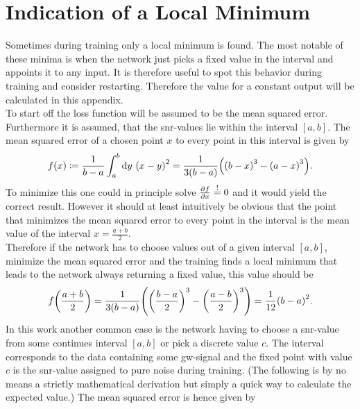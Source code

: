\section{Indication of a Local Minimum}\label{app:network_does_not_learn}
Sometimes during training only a local minimum is found. The most notable of these minima is when the network just picks a fixed value in the interval and appoints it to any input. It is therefore useful to spot this behavior during training and consider restarting. Therefore the value for a constant output will be calculated in this appendix.
\medskip\\
To start off the loss function will be assumed to be the mean squared error. Furthermore it is assumed, that the \gls{snr}-values lie within the interval $\left[a,b\right]$. The mean squared error of a chosen point $x$ to every point in this interval is given by
\begin{equation}
f(x)\coloneqq\frac{1}{b-a}\int_a^b\diff y\ \lr{x-y}^2=\frac{1}{3\lr{b-a}}\lr{\lr{b-x}^3-\lr{a-x}^3}.
\end{equation}
To minimize this one could in principle solve $\frac{\partial f}{\partial x}\overset{!}{=} 0$ and it would yield the correct result. However it should at least intuitively be obvious that the point that minimizes the mean squared error to every point in the interval is the mean value of the interval $x=\frac{a+b}{2}$.\\
Therefore if the network has to choose values out of a given interval $\left[a,b\right]$, minimize the mean squared error and the training finds a local minimum that leads to the network always returning a fixed value, this value should be
\begin{equation}
f{\left( \frac{a+b}{2} \right)}=\frac{1}{3{\left( b-a \right)}}{\left( {\left( \frac{b-a}{2} \right)}^3-{\left( \frac{a-b}{2} \right)}^3 \right)}=\frac{1}{12}{\left( b-a \right)}^2.
\end{equation}
In this work another common case is the network having to choose a \gls{snr}-value from some continues interval $\left[a,b\right]$ or pick a discrete value $c$. The interval corresponds to the data containing some \gls{gw}-signal and the fixed point with value $c$ is the \gls{snr}-value assigned to pure noise during training. (The following is by no means a strictly mathematical derivation but simply a quick way to calculate the expected value.) The mean squared error is hence given by
